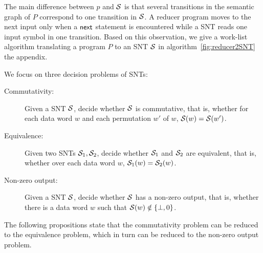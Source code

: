 The main difference between $p$ and ${\mathcal{S} }$ is that several transitions in the semantic graph of $P$ correspond to one transition in ${\mathcal{S} }$. A reducer program moves to the next input only when a $\mathsf{next}$ statement is encountered while a SNT reads one input symbol in one transition. Based on this observation, we give a work-list algorithm translating a program $P$ to an SNT ${\mathcal{S} }$ in algorithm~\ref{fig:reducer2SNT} the appendix.





%
%
%




We focus on three decision problems of SNTs:
\begin{description}
\item[Commutativity:] Given a SNT ${\mathcal{S} }$, decide whether ${\mathcal{S} }$ is commutative, that is, whether for each data word $w$ and each permutation $w'$ of $w$, ${\mathcal{S} }(w)={\mathcal{S} }(w')$.
%
\item[Equivalence:] Given two SNTs ${\mathcal{S} }_1,{\mathcal{S} }_2$, decide whether ${\mathcal{S} }_1$ and ${\mathcal{S} }_2$ are equivalent, that is, whether over each data word $w$, ${\mathcal{S} }_1(w)={\mathcal{S} }_2(w)$.
%
\item[Non-zero output:] Given a SNT ${\mathcal{S} }$, decide whether ${\mathcal{S} }$ has a non-zero output, that is, whether there is a data word $w$ such that ${\mathcal{S} }(w)\notin \{\bot, 0\}$. 
\end{description}
The following propositions state that the commutativity problem can be reduced to the equivalence problem, which in turn can be reduced to the non-zero output problem.


